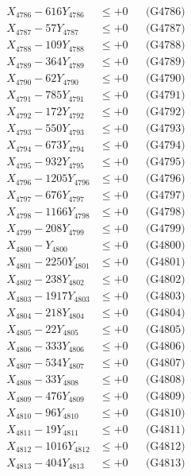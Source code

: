 \documentclass[a4paper,10pt]{article}
\begin{document}
{\begin{align}
X_{4786} - 616Y_{4786} &\leq +0 && \text{(G4786)} \\
X_{4787} - 57Y_{4787} &\leq +0 && \text{(G4787)} \\
X_{4788} - 109Y_{4788} &\leq +0 && \text{(G4788)} \\
X_{4789} - 364Y_{4789} &\leq +0 && \text{(G4789)} \\
X_{4790} - 62Y_{4790} &\leq +0 && \text{(G4790)} \\
\allowbreak
X_{4791} - 785Y_{4791} &\leq +0 && \text{(G4791)} \\
X_{4792} - 172Y_{4792} &\leq +0 && \text{(G4792)} \\
X_{4793} - 550Y_{4793} &\leq +0 && \text{(G4793)} \\
X_{4794} - 673Y_{4794} &\leq +0 && \text{(G4794)} \\
X_{4795} - 932Y_{4795} &\leq +0 && \text{(G4795)} \\
X_{4796} - 1205Y_{4796} &\leq +0 && \text{(G4796)} \\
X_{4797} - 676Y_{4797} &\leq +0 && \text{(G4797)} \\
X_{4798} - 1166Y_{4798} &\leq +0 && \text{(G4798)} \\
X_{4799} - 208Y_{4799} &\leq +0 && \text{(G4799)} \\
X_{4800} - Y_{4800} &\leq +0 && \text{(G4800)} \\
\allowbreak
X_{4801} - 2250Y_{4801} &\leq +0 && \text{(G4801)} \\
X_{4802} - 238Y_{4802} &\leq +0 && \text{(G4802)} \\
X_{4803} - 1917Y_{4803} &\leq +0 && \text{(G4803)} \\
X_{4804} - 218Y_{4804} &\leq +0 && \text{(G4804)} \\
X_{4805} - 22Y_{4805} &\leq +0 && \text{(G4805)} \\
X_{4806} - 333Y_{4806} &\leq +0 && \text{(G4806)} \\
X_{4807} - 534Y_{4807} &\leq +0 && \text{(G4807)} \\
X_{4808} - 33Y_{4808} &\leq +0 && \text{(G4808)} \\
X_{4809} - 476Y_{4809} &\leq +0 && \text{(G4809)} \\
X_{4810} - 96Y_{4810} &\leq +0 && \text{(G4810)} \\
\allowbreak
X_{4811} - 19Y_{4811} &\leq +0 && \text{(G4811)} \\
X_{4812} - 1016Y_{4812} &\leq +0 && \text{(G4812)} \\
X_{4813} - 404Y_{4813} &\leq +0 && \text{(G4813)} \\

\end{align}}
\end{document}
